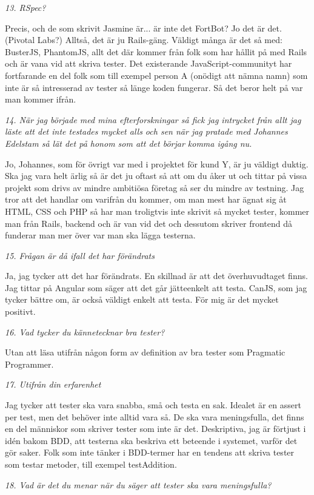 \documentclass[11pt]{article}
\begin{document}
\emph{13. RSpec?}

Precis, och de som skrivit Jasmine är... är inte det FortBot? Jo det är det. (Pivotal Labs?) Alltså, det är ju Rails-gäng. Väldigt många är det så med: BusterJS, PhantomJS, allt det där kommer från folk som har hållit på med Rails och är vana vid att skriva tester. Det existerande JavaScript-communityt har fortfarande en del folk som till exempel person A (onödigt att nämna namn) som inte är så intresserad av tester så länge koden fungerar. Så det beror helt på var man kommer ifrån.

\emph{14. När jag började med mina efterforskningar så fick jag intrycket från allt jag läste att det inte testades mycket alls och sen när jag pratade med Johannes Edelstam så lät det på honom som att det börjar komma igång nu.}

Jo, Johannes, som för övrigt var med i projektet för kund Y, är ju väldigt duktig. Ska jag vara helt ärlig så är det ju oftast så att om du åker ut och tittar på vissa projekt som drivs av mindre ambitiösa företag så ser du mindre av testning. Jag tror att det handlar om varifrån du kommer, om man mest har ägnat sig åt HTML, CSS och PHP så har man troligtvis inte skrivit så mycket tester, kommer man från Rails, backend och är van vid det och dessutom skriver frontend då funderar man mer över var man ska lägga testerna.

\emph{15. Frågan är då ifall det har förändrats}

Ja, jag tycker att det har förändrats. En skillnad är att det överhuvudtaget finns. Jag tittar på Angular som säger att det går jätteenkelt att testa. CanJS, som jag tycker bättre om, är också väldigt enkelt att testa. För mig är det mycket positivt.

\emph{16. Vad tycker du kännetecknar bra tester?}

Utan att läsa utifrån någon form av definition av bra tester som Pragmatic Programmer.

\emph{17. Utifrån din erfarenhet}

Jag tycker att tester ska vara snabba, små och testa en sak. Idealet är en assert per test, men det behöver inte alltid vara så. De ska vara meningsfulla, det finns en del människor som skriver tester som inte är det. Deskriptiva, jag är förtjust i idén bakom BDD, att testerna ska beskriva ett beteende i systemet, varför det gör saker. Folk som inte tänker i BDD-termer har en tendens att skriva tester som testar metoder, till exempel testAddition.

\emph{18. Vad är det du menar när du säger att tester ska vara meningsfulla?}
\end{document}
